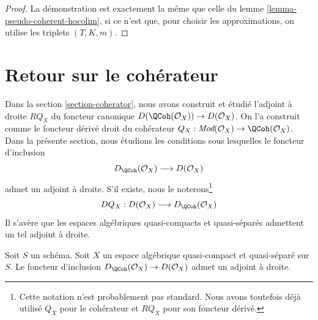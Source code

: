\begin{proof}
La d\'emonstration est exactement la m\^eme que celle du
lemme \ref{lemma-pseudo-coherent-hocolim},
si ce n'est que, pour choisir les approximations, on utilise
les triplets $(T, K, m)$.
\end{proof}

\section{Retour sur le cohérateur}
\label{section-better-coherator}

\noindent
Dans la section \ref{section-coherator}, nous avons construit et étudié
l'adjoint à droite $RQ_X$ du foncteur canonique
$D(\QCoh(\mathcal{O}_X)) \to D(\mathcal{O}_X)$.
On l'a construit comme le foncteur dérivé droit du cohérateur
$Q_X : \textit{Mod}(\mathcal{O}_X) \to \QCoh(\mathcal{O}_X)$.
Dans la présente section, nous étudions les conditions sous lesquelles le foncteur d'inclusion
$$
D_\QCoh(\mathcal{O}_X) \longrightarrow D(\mathcal{O}_X)
$$
admet un adjoint à droite. S'il existe, nous le
noterons\footnote{Cette notation n'est probablement pas standard. Nous avons toutefois déjà
utilisé $Q_X$ pour le cohérateur et $RQ_X$ pour son foncteur dérivé.}
$$
DQ_X :
D(\mathcal{O}_X) \longrightarrow D_\QCoh(\mathcal{O}_X)
$$
Il s'avère que les espaces algébriques quasi-compacts et quasi-séparés
admettent un tel adjoint à droite.

\begin{lemma}
\label{lemma-better-coherator}
Soit $S$ un schéma.
Soit $X$ un espace algébrique quasi-compact et quasi-séparé sur $S$.
Le foncteur d'inclusion $D_\QCoh(\mathcal{O}_X) \to D(\mathcal{O}_X)$
admet un adjoint à droite.
\end{lemma}

